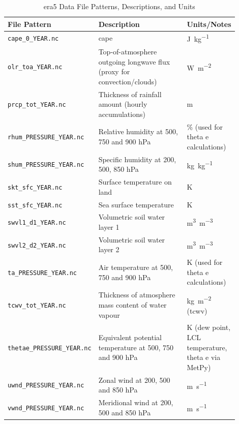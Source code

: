 \begin{table}[ht]
    \centering
    \caption{\acrshort{era5} Data File Patterns, Descriptions, and Units}
    \label{tab:era5-file-patterns}
    \begin{tabular}{p{0.28\linewidth} p{0.42\linewidth} p{0.2\linewidth}}
        \toprule
        File Pattern & Description & Units/Notes \\
        \midrule
        \texttt{cape\_0\_YEAR.nc} & \acrfull{cape} & \unit{\joule\per\kilogram} \\
        \texttt{olr\_toa\_YEAR.nc} & Top-of-atmosphere outgoing longwave flux (proxy for convection/clouds) & \unit{\watt\per\meter\squared} \\
        \texttt{prcp\_tot\_YEAR.nc} & Thickness of rainfall amount (hourly accumulations) & \unit{\meter} \\
        \texttt{rhum\_PRESSURE\_YEAR.nc} & Relative humidity at 500, 750 and 900 \unit{\hecto\pascal} & \unit{\percent} (used for theta e calculations) \\
        \texttt{shum\_PRESSURE\_YEAR.nc} & Specific humidity at 200, 500, 850 \unit{\hecto\pascal} & \unit{\kilogram\per\kilogram} \\
        \texttt{skt\_sfc\_YEAR.nc} & Surface temperature on land & \unit{\kelvin} \\
        \texttt{sst\_sfc\_YEAR.nc} & Sea surface temperature & \unit{\kelvin} \\
        \texttt{swvl1\_d1\_YEAR.nc} & Volumetric soil water layer 1 & \unit{\meter\cubed\per\meter\cubed} \\
        \texttt{swvl2\_d2\_YEAR.nc} & Volumetric soil water layer 2 & \unit{\meter\cubed\per\meter\cubed} \\
        \texttt{ta\_PRESSURE\_YEAR.nc} & Air temperature at 500, 750 and 900 \unit{\hecto\pascal} & \unit{\kelvin} (used for theta e calculations) \\
        \texttt{tcwv\_tot\_YEAR.nc} & Thickness of atmosphere mass content of water vapour & \unit{\kilogram\per\meter\squared} (\acrfull{tcwv}) \\
        \texttt{thetae\_PRESSURE\_YEAR.nc} & Equivalent potential temperature at 500, 750 and 900 \unit{\hecto\pascal} & \unit{\kelvin} (dew point, LCL temperature, theta e via MetPy) \\
        \texttt{uwnd\_PRESSURE\_YEAR.nc} & Zonal wind at 200, 500 and 850 \unit{\hecto\pascal} & \unit{\meter\per\second} \\
        \texttt{vwnd\_PRESSURE\_YEAR.nc} & Meridional wind at 200, 500 and 850 \unit{\hecto\pascal} & \unit{\meter\per\second} \\
        \bottomrule
    \end{tabular}
\end{table}


